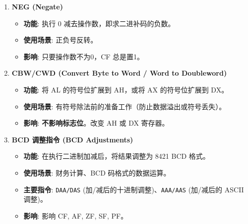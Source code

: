 \documentclass[12pt,a4paper]{ctexart}
\begin{document}
\begin{enumerate}
\begin{itemize}
        \item \textbf{影响}: 影响 ZF, SF, OF, AF, PF，\textbf{不影响 CF}。
    \end{itemize}
    \item \textbf{NEG (Negate)}
    \begin{itemize}
        \item \textbf{功能}: 执行 0 减去操作数，即求二进补码的负数。
        \item \textbf{使用场景}: 正负号反转。
        \item \textbf{影响}: 只要操作数不为0，CF 总是置1。
    \end{itemize}
    \item \textbf{CBW/CWD (Convert Byte to Word / Word to Doubleword)}
    \begin{itemize}
        \item \textbf{功能}: 将 AL 的符号位扩展到 AH，或将 AX 的符号位扩展到 DX。
        \item \textbf{使用场景}: 有符号除法前的准备工作（防止数据溢出或符号丢失）。
        \item \textbf{影响}: \textbf{不影响标志位}。改变 AH 或 DX 寄存器。
    \end{itemize}
    \item \textbf{BCD 调整指令 (BCD Adjustments)}
    \begin{itemize}
        \item \textbf{功能}: 在执行二进制加减后，将结果调整为 8421 BCD 格式。
        \item \textbf{使用场景}: 财务计算、BCD 码格式的数据运算。
        \item \textbf{主要指令}: \texttt{DAA/DAS} (加/减后的十进制调整)、\texttt{AAA/AAS} (加/减后的 ASCII 调整)。
        \item \textbf{影响}: 影响 CF, AF, ZF, SF, PF。
    \end{itemize}
\end{enumerate}
\end{document}
